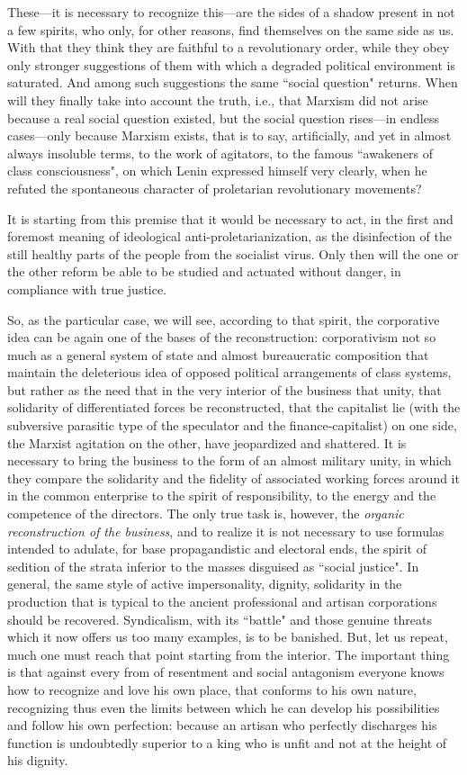 These—it is necessary to recognize this—are the sides of a shadow present in not a few spirits, who only, for other reasons, find themselves on the same side as us. With that they think they are faithful to a revolutionary order, while they obey only stronger suggestions of them with which a degraded political environment is saturated. And among such suggestions the same ``social question" returns. When will they finally take into account the truth, i.e., that Marxism did not arise because a real social question existed, but the social question rises—in endless cases—only because Marxism exists, that is to say, artificially, and yet in almost always insoluble terms, to the work of agitators, to the famous ``awakeners of class consciousness", on which Lenin expressed himself very clearly, when he refuted the spontaneous character of proletarian revolutionary movements?

It is starting from this premise that it would be necessary to act, in the first and foremost meaning of ideological anti-proletarianization, as the disinfection of the still healthy parts of the people from the socialist virus. Only then will the one or the other reform be able to be studied and actuated without danger, in compliance with true justice.

So, as the particular case, we will see, according to that spirit, the corporative idea can be again one of the bases of the reconstruction: corporativism not so much as a general system of state and almost bureaucratic composition that maintain the deleterious idea of opposed political arrangements of class systems, but rather as the need that in the very interior of the business that unity, that solidarity of differentiated forces be reconstructed, that the capitalist lie (with the subversive parasitic type of the speculator and the finance-capitalist) on one side, the Marxist agitation on the other, have jeopardized and shattered. It is necessary to bring the business to the form of an almost military unity, in which they compare the solidarity and the fidelity of associated working forces around it in the common enterprise to the spirit of responsibility, to the energy and the competence of the directors. The only true task is, however, the \emph{organic reconstruction of the business}, and to realize it is not necessary to use formulas intended to adulate, for base propagandistic and electoral ends, the spirit of sedition of the strata inferior to the masses disguised as ``social justice". In general, the same style of active impersonality, dignity, solidarity in the production that is typical to the ancient professional and artisan corporations should be recovered. Syndicalism, with its ``battle" and those genuine threats which it now offers us too many examples, is to be banished. But, let us repeat, much one must reach that point starting from the interior. The important thing is that against every from of resentment and social antagonism everyone knows how to recognize and love his own place, that conforms to his own nature, recognizing thus even the limits between which he can develop his possibilities and follow his own perfection: because an artisan who perfectly discharges his function is undoubtedly superior to a king who is unfit and not at the height of his dignity.

